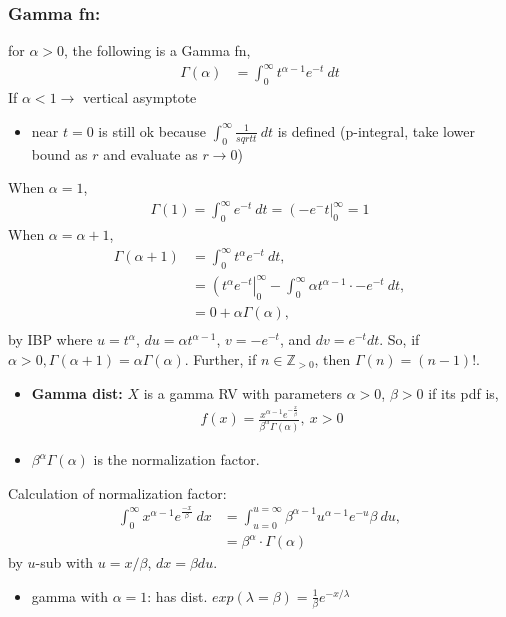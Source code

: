 \documentclass{article}
\begin{document}
    \subsubsection*{Gamma fn:}
    for $\alpha>0$, the following is a Gamma fn,
    \begin{align*}
    \Gamma(\alpha) &= \int_{0}^{\infty} t^{\alpha-1}e^{-t}\ dt
    \end{align*}
    If $\alpha < 1 \rightarrow$ vertical asymptote
    \begin{itemize}
    \item near $t=0$ is still ok because $\int_{0}^{\infty} \frac{1}{sqrt{t}}\ dt$ is defined (p-integral, take lower bound as $r$ and evaluate as $r\rightarrow0$)
    \end{itemize}
    When $\alpha=1$,
    \begin{align*}
    \Gamma(1) = \int_{0}^{\infty} e^{-t}\ dt = \left(-e^-t\right\vert_{0}^{\infty}=1
    \end{align*}
    When $\alpha=\alpha+1$,
    \begin{align*}
    \Gamma(\alpha+1)&=\int_{0}^{\infty}t^{\alpha}e^{-t}\ dt,\\
    &= \left(t^{\alpha}e^{-t}\right\vert_{0}^{\infty} - \int_{0}^{\infty} \alpha t^{\alpha - 1} \cdot -e^{-t}\ dt, \\
    &= 0 + \alpha \Gamma(\alpha), \\
    \end{align*}
    by IBP where $u=t^{\alpha}$, $du = \alpha t^{\alpha-1}$, $v=-e^{-t}$, and $dv=e^{-t}dt$. So, if $\boxed{\alpha > 0, \Gamma(\alpha+1)=\alpha\Gamma(\alpha)}$.
    Further, if $n\in\mathbb{Z}_{>0}$, then $\Gamma(n)=(n-1)!$.
    \begin{itemize}
    \item \textbf{Gamma dist:} $X$ is a gamma RV with parameters $\alpha>0$, $\beta>0$ if its pdf is,
    \begin{align*}
    f(x) = \frac{x^{\alpha - 1}e^{-\frac{x}{\beta}}}{\beta^\alpha \Gamma(\alpha)},\ x>0
    \end{align*}
    \item $\beta^\alpha\Gamma(\alpha)$ is the normalization factor.
    \end{itemize}
    Calculation of normalization factor:
    \begin{align*}
    \int_{0}^{\infty} x^{\alpha-1}e^{\frac{-x}{\beta}}\ dx &= \int_{u=0}^{u=\infty}\beta^{\alpha-1}u^{\alpha-1}e^{-u}\beta\ du,\\
    &= \beta^\alpha \cdot \Gamma(\alpha)
    \end{align*}
    by $u$-sub with $u=x/\beta$, $dx=\beta du$.
    \begin{itemize}
    \item gamma with $\alpha=1$: has dist. $exp(\lambda=\beta) = \frac{1}{\beta}e^{-x/\lambda}$
    \end{itemize}
\end{document}
